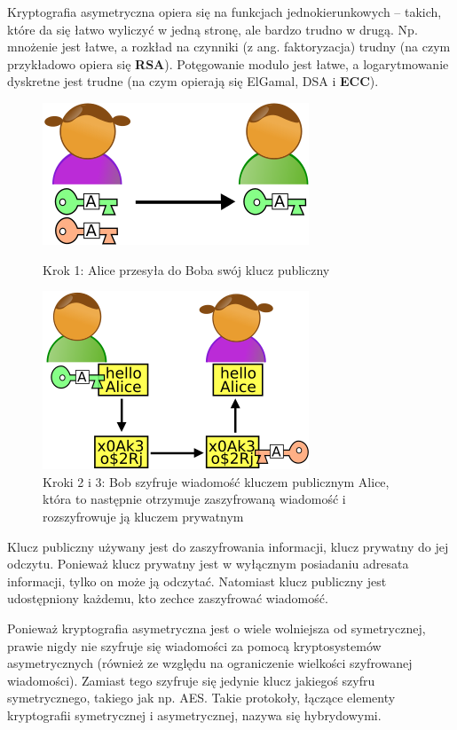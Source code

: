 \documentclass[a4paper,12pt,oneside]{book}
\begin{document}
Kryptografia asymetryczna opiera się na funkcjach jednokierunkowych – takich, które da się łatwo wyliczyć w jedną stronę, ale bardzo trudno w drugą. Np. mnożenie jest łatwe, a rozkład na czynniki (z ang. faktoryzacja) trudny (na czym przykładowo opiera się \textbf{RSA}). Potęgowanie modulo jest łatwe, a logarytmowanie dyskretne jest trudne (na czym opierają się ElGamal, DSA i \textbf{ECC}).

\begin{figure}[h]
	\centering\includegraphics[scale=0.45]{krypt_asym_1.png}
	\caption{Krok 1: Alice przesyła do Boba swój klucz publiczny}
	
	\hspace{5pt}
	
	\centering\includegraphics[scale=0.45]{krypt_asym_2.png}
	\caption{Kroki 2 i 3: Bob szyfruje wiadomość kluczem publicznym Alice, która to następnie otrzymuje zaszyfrowaną wiadomość i rozszyfrowuje ją kluczem prywatnym}
\end{figure}

Klucz publiczny używany jest do zaszyfrowania informacji, klucz prywatny do jej odczytu. Ponieważ klucz prywatny jest w wyłącznym posiadaniu adresata informacji, tylko on może ją odczytać. Natomiast klucz publiczny jest udostępniony każdemu, kto zechce zaszyfrować wiadomość.

Ponieważ kryptografia asymetryczna jest o wiele wolniejsza od symetrycznej, prawie nigdy nie szyfruje się wiadomości za pomocą kryptosystemów asymetrycznych (również ze względu na ograniczenie wielkości szyfrowanej wiadomości). Zamiast tego szyfruje się jedynie klucz jakiegoś szyfru symetrycznego, takiego jak np. AES. Takie protokoły, łączące elementy kryptografii symetrycznej i asymetrycznej, nazywa się hybrydowymi.
\end{document}
